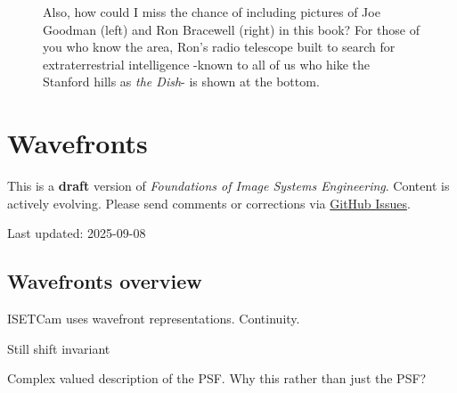 \documentclass[
  letterpaper,
]{book}
\begin{document}
\begin{tcolorbox}
\begin{figure}[H]
{}

\caption{\label{fig-bracewell-goodman}Also, how could I miss the chance
of including pictures of Joe Goodman (left) and Ron Bracewell (right) in
this book? For those of you who know the area, Ron's radio telescope
built to search for extraterrestrial intelligence -known to all of us
who hike the Stanford hills as \emph{the Dish}- is shown at the bottom.}

\end{figure}%

\end{tcolorbox}


\chapter{Wavefronts}\label{sec-optics-wavefront}

\begin{tcolorbox}[enhanced jigsaw, colframe=quarto-callout-warning-color-frame, titlerule=0mm, rightrule=.15mm, opacitybacktitle=0.6, colback=white, leftrule=.75mm, coltitle=black, title=\textcolor{quarto-callout-warning-color}{\faExclamationTriangle}\hspace{0.5em}{Work in Progress}, bottomrule=.15mm, colbacktitle=quarto-callout-warning-color!10!white, breakable, left=2mm, bottomtitle=1mm, toptitle=1mm, opacityback=0, arc=.35mm, toprule=.15mm]

This is a \textbf{draft} version of \emph{Foundations of Image Systems
Engineering}. Content is actively evolving. Please send comments or
corrections via \href{https://github.com/wandell/FISE-git/issues}{GitHub
Issues}.

Last updated: 2025-09-08

\end{tcolorbox}

\section{Wavefronts overview}\label{sec-optics-wavefront-overview}

ISETCam uses wavefront representations. Continuity.

Still shift invariant

Complex valued description of the PSF. Why this rather than just the
PSF?
\end{document}

